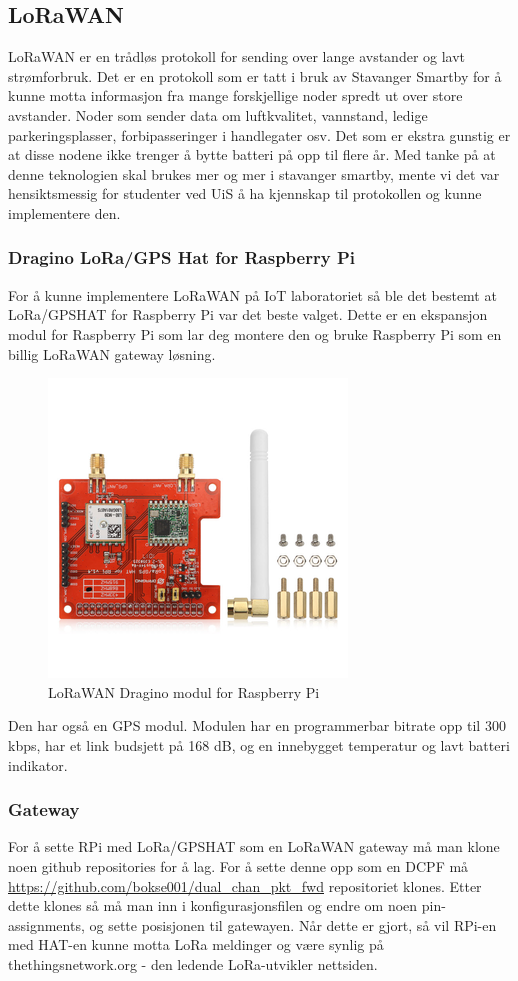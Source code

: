 \documentclass{article}
\begin{document}
\subsection{LoRaWAN}
LoRaWAN er en trådløs protokoll for sending over lange avstander og lavt strømforbruk. Det er en protokoll som er tatt i bruk av Stavanger Smartby for å kunne motta informasjon fra mange forskjellige noder spredt ut over store avstander. Noder som sender data om luftkvalitet, vannstand, ledige parkeringsplasser, forbipasseringer i handlegater osv. Det som er ekstra gunstig er at disse nodene  ikke trenger å bytte batteri på opp til flere år. Med tanke på at denne teknologien skal brukes mer og mer i stavanger smartby, mente vi det var hensiktsmessig for studenter ved UiS å ha kjennskap til protokollen og kunne implementere den. 

\subsubsection{Dragino LoRa/GPS Hat for Raspberry Pi}
For å kunne implementere LoRaWAN på IoT laboratoriet så ble det bestemt at LoRa/GPS\textunderscore HAT for Raspberry Pi var det beste valget. Dette er en ekspansjon modul for Raspberry Pi som lar deg montere den og bruke Raspberry Pi som en billig LoRaWAN gateway løsning. 

\begin{figure} [!ht]
	\centering
		\includegraphics[width=0.5\linewidth]{loradraginohat} 
\caption{LoRaWAN Dragino modul for Raspberry Pi}
\end{figure}

Den har også en GPS modul. Modulen har en programmerbar bitrate opp til 300 kbps, har et link budsjett på 168 dB, og en innebygget temperatur og lavt batteri indikator. 

\subsubsection{Gateway}
For å sette RPi med LoRa/GPS\textunderscore HAT som en LoRaWAN gateway må man klone noen github repositories for å lag. For å sette denne opp som en DCPF må \\\url{https://github.com/bokse001/dual_chan_pkt_fwd} repositoriet klones. Etter dette klones så må man inn i konfigurasjonsfilen og endre om noen pin-assignments, og sette posisjonen til gatewayen. Når dette er gjort, så vil RPi-en med HAT-en kunne motta LoRa meldinger og være synlig på thethingsnetwork.org - den ledende LoRa-utvikler nettsiden.
\end{document}
